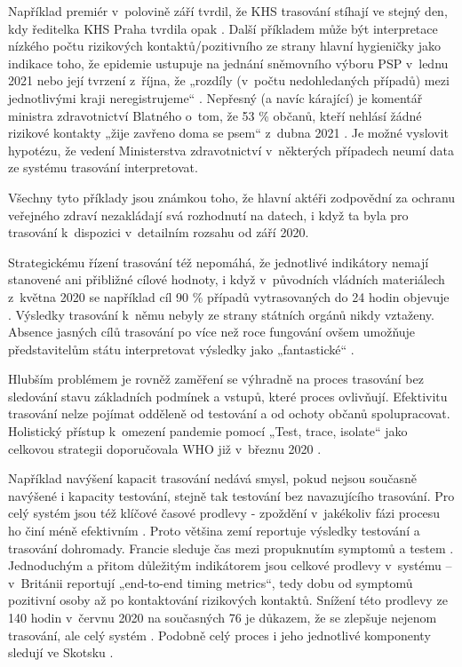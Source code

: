 Například premiér v~polovině září tvrdil, že KHS trasování stíhají ve stejný den, kdy ředitelka KHS Praha tvrdila opak \cite{tr_denik_cz}. Další příkladem může být interpretace nízkého počtu rizikových kontaktů/pozitivního ze strany hlavní hygieničky jako indikace toho, že epidemie ustupuje na jednání sněmovního výboru PSP v~lednu 2021 \cite{tr_denik_n} nebo její tvrzení z~října, že „rozdíly (v~počtu nedohledaných případů) mezi jednotlivými kraji neregistrujeme“ \cite{tr_novinky_cz}. Nepřesný (a navíc kárající) je komentář ministra zdravotnictví Blatného o~tom, že 53 \% občanů, kteří nehlásí žádné rizikové kontakty „žije zavřeno doma se psem“ z~dubna 2021 \cite{tr_tvidnes_cz}. Je možné vyslovit hypotézu, že vedení Ministerstva zdravotnictví v~některých případech neumí data ze systému trasování interpretovat. 

Všechny tyto příklady jsou známkou toho, že hlavní aktéři zodpovědní za ochranu veřejného zdraví nezakládají svá rozhodnutí na datech, i když ta byla pro trasování k~dispozici v~detailním rozsahu od září 2020.

Strategickému řízení trasování též nepomáhá, že jednotlivé indikátory nemají stanovené ani přibližné cílové hodnoty, i když v~původních vládních materiálech z~května 2020 se například cíl 90 \% případů vytrasovaných do 24 hodin objevuje \cite{tr_vlada01}. Výsledky trasování k~němu nebyly ze strany státních orgánů nikdy vztaženy. Absence jasných cílů trasování po více než roce fungování ovšem umožňuje představitelům státu interpretovat výsledky jako „fantastické“ \cite{tr_vlada02}.

Hlubším problémem je rovněž zaměření se výhradně na proces trasování bez sledování stavu základních podmínek a vstupů, které proces ovlivňují. Efektivitu trasování nelze pojímat odděleně od testování a od ochoty občanů spolupracovat. Holistický přístup k~omezení pandemie pomocí „Test, trace, isolate“ jako celkovou strategii doporučovala WHO již v~březnu 2020 \cite{tr_WHO_02}.

Například navýšení kapacit trasování nedává smysl, pokud nejsou současně navýšené i kapacity testování, stejně tak testování bez navazujícího trasování. Pro celý systém jsou též klíčové časové prodlevy - zpoždění v~jakékoliv fázi procesu ho činí méně efektivním \cite{tr_systems_successful_2020}. Proto většina zemí reportuje výsledky testování a trasování dohromady. Francie sleduje čas mezi propuknutím symptomů a testem \cite{tr_france}. Jednoduchým a přitom důležitým indikátorem jsou celkové prodlevy v~systému -- v~Británii reportují „end-to-end timing metrics“, tedy dobu od symptomů pozitivní osoby až po kontaktování rizikových kontaktů. Snížení této prodlevy ze 140 hodin v~červnu 2020 na současných 76 je důkazem, že se zlepšuje nejenom trasování, ale celý systém \cite{tr_gov_uk01}. Podobně celý proces i jeho jednotlivé komponenty sledují ve Skotsku \cite{tr_scotland}.

